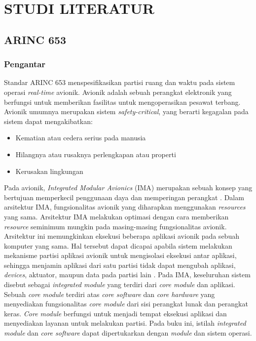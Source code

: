 \chapter{STUDI LITERATUR}

\section{ARINC 653}

\subsection{Pengantar}

Standar ARINC 653 menspesifikasikan partisi ruang dan waktu pada sistem operasi \textit{real-time} avionik.
Avionik adalah sebuah perangkat elektronik yang berfungsi untuk memberikan fasilitas untuk mengoperasikan pesawat terbang.
Avionik umumnya merupakan sistem \textit{safety-critical}, yang berarti kegagalan pada sistem dapat mengakibatkan:
\begin{itemize}
    \item Kematian atau cedera serius pada manusia
    \item Hilangnya atau rusaknya perlengkapan atau properti
    \item Kerusakan lingkungan
\end{itemize}

Pada avionik, \textit{Integrated Modular Avionics} (IMA) merupakan sebuah konsep yang bertujuan memperkecil penggunaan daya dan memperingan perangkat \citep[p.~2.A.2-1]{Garside2009}.
Dalam arsitektur IMA, fungsionalitas avionik yang diharapkan menggunakan \textit{resources} yang sama.
Arsitektur IMA melakukan optimasi dengan cara memberikan \textit{resource} seminimum mungkin pada masing-masing fungsionalitas avionik.
Arsitektur ini memungkinkan eksekusi beberapa aplikasi avionik pada sebuah komputer yang sama.
Hal tersebut dapat dicapai apabila sistem melakukan mekanisme partisi aplikasi avionik untuk mengisolasi eksekusi antar aplikasi, sehingga menjamin aplikasi dari satu partisi tidak dapat mengubah aplikasi, \textit{devices}, aktuator, maupun data pada partisi lain \citep[pp.~11-12]{Rushby2000}.
Pada IMA, keseluruhan sistem disebut sebagai \textit{integrated module} yang terdiri dari \textit{core module} dan aplikasi.
Sebuah \textit{core module} terdiri atas \textit{core software} dan \textit{core hardware} yang menyediakan fungsionalitas \textit{core module} dari sisi perangkat lunak dan perangkat keras.
\textit{Core module} berfungsi untuk menjadi tempat eksekusi aplikasi dan menyediakan layanan untuk melakukan partisi.
Pada buku ini, istilah \textit{integrated module} dan \textit{core software} dapat dipertukarkan dengan \textit{module} dan sistem operasi.

